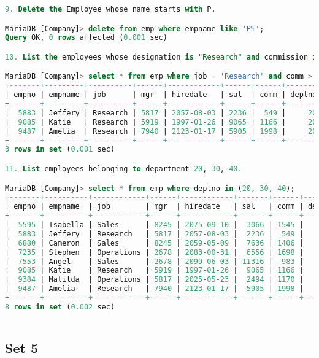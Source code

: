 \documentclass[11pt]{article}
\begin{document}
\begin{lstlisting}[language=SQL]
9. Delete the Employee whose name starts with P.

MariaDB [Company]> delete from emp where empname like 'P%';
Query OK, 0 rows affected (0.001 sec)

10. List the employees whose designation is "Research" and commission is > 500.

MariaDB [Company]> select * from emp where job = 'Research' and comm > 500;
+-------+---------+----------+------+------------+------+------+--------+
| empno | empname | job      | mgr  | hiredate   | sal  | comm | deptno |
+-------+---------+----------+------+------------+------+------+--------+
|  5883 | Jeffery | Research | 5817 | 2057-08-03 | 2236 |  549 |     20 |
|  9085 | Katie   | Research | 5919 | 1997-01-26 | 9065 | 1166 |     20 |
|  9487 | Amelia  | Research | 7940 | 2123-01-17 | 5905 | 1998 |     20 |
+-------+---------+----------+------+------------+------+------+--------+
3 rows in set (0.001 sec)

11. List employees belonging to department 20, 30, 40.

MariaDB [Company]> select * from emp where deptno in (20, 30, 40);
+-------+----------+------------+------+------------+-------+------+--------+
| empno | empname  | job        | mgr  | hiredate   | sal   | comm | deptno |
+-------+----------+------------+------+------------+-------+------+--------+
|  5595 | Isabella | Sales      | 8245 | 2075-09-10 |  3066 | 1545 |     30 |
|  5883 | Jeffery  | Research   | 5817 | 2057-08-03 |  2236 |  549 |     20 |
|  6880 | Cameron  | Sales      | 8245 | 2059-05-09 |  7636 | 1406 |     30 |
|  7235 | Stephen  | Operations | 2678 | 2083-00-31 |  6556 | 1698 |     40 |
|  7553 | Angel    | Sales      | 2678 | 2099-06-03 | 11316 |  983 |     30 |
|  9085 | Katie    | Research   | 5919 | 1997-01-26 |  9065 | 1166 |     20 |
|  9384 | Matilda  | Operations | 5817 | 2025-05-23 |  2494 | 1170 |     40 |
|  9487 | Amelia   | Research   | 7940 | 2123-01-17 |  5905 | 1998 |     20 |
+-------+----------+------------+------+------------+-------+------+--------+
8 rows in set (0.002 sec)
	
\end{lstlisting}

\subsection{Set 5}
\end{document}
